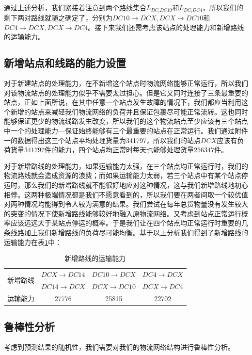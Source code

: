 \documentclass{MathorCupmodeling}
\begin{document}
通过上述分析，我们紧接着注意到两个路线集合$L_{DC_iDC10}$和$L_{DC_iDC4}$，所以我们的剩下两对路线就随之确定了，分别为$DC10\to DCX,DCX\to DC10$和$DC4\to DCX,DCX\to DC4$。接下来我们还需考虑该站点的处理能力和新增路线的运输能力。
\subsection{新增站点和线路的能力设置}
对于新建站点的处理能力，在不新增这个站点时物流网络能够正常运行，所以我们对该物流站点的处理能力似乎不需要太过担心。但是它又同时连接了三条最重要的站点，正如上面所说，在其中任意一个站点发生故障的情况下，我们都应当利用这个新增的站点来减轻我们物流网络的负荷并且保证包裹尽可能正常流转。这也同时能够保证更少的物流线路发生改变，所以我们的这个物流站点至少应该有三个站点中一个的处理能力—保证始终能够有三个最重要的站点在正常运行。我们通过附件一的数据得出这三个站点平均处理货量为341797，所以我们的站点$DCX$应该有负荷货量$341797$件的能力，四个站点均正常时每天也能够处理货量$256347$件。

对于新增路线的处理能力，如果运输能力太强，在三个站点均正常运行时，我们的物流路线就会造成资源的浪费；而如果运输能力太弱，若三个站点中有某个站点停运时，那么我们的新增路线就不能很好地应对这种情况，这与我们新增路线地初心相悖。这两种极端情况都是我们不愿意看到的，所以我们要在两者间取一个较优值对两种情况均能得到令人较为满意的结果。我们尝试在每年总货物量没有发生较大的突变的情况下使新增路线能够较好地融入原物流网络。又考虑到站点正常运行概率应该远远大于某站点停运的概率。于是我们让在四个站点均正常运行时重要的几条线路加上我们新增路线的负荷尽可能均衡。基于以上分析我们得到了新增路线的运输能力在表\ref{xz}中：
\begin{table}[h]
\centering
\caption{新增路线的运输能力}
\label{xz}
\begin{tabular}{cccc}
\hline
\multirow{2}{*}{新增路线} & $DCX\to DC14$ & $DC10\to DCX$ & $DC4\to DCX$ \\ \cline{2-4} 
                      & $DC14\to DCX$ & $DCX\to DC10$ & $DCX\to DC4$ \\ \hline
运输能力                  & 27776         & 25815         & 22702        \\ \hline
\end{tabular}
\end{table}
\subsection{鲁棒性分析}
考虑到预测结果的随机性，我们需要对我们的物流网络结构进行鲁棒性分析。
\end{document}
